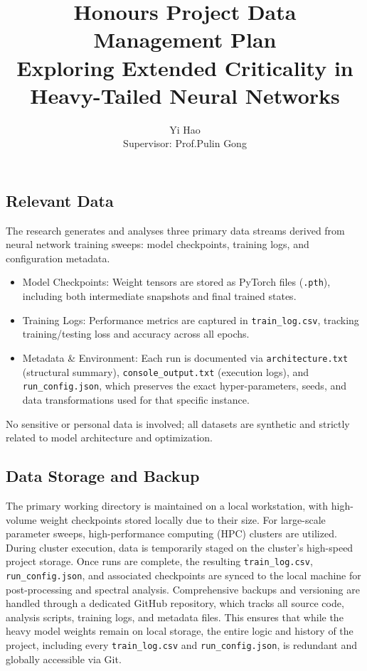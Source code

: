 \documentclass[11pt,a4paper]{article}
\author{Yi Hao \vspace{0.35cm} \\ Supervisor: Prof.\;Pulin Gong}
\title{\textbf{Honours Project Data Management Plan} \\[1.5ex] Exploring Extended Criticality in Heavy-Tailed Neural Networks}
\begin{document}
\maketitle
\subsection*{Relevant Data}
The research generates and analyses three primary data streams derived from neural network training sweeps: model checkpoints, training logs, and configuration metadata.
\begin{itemize}
\item Model Checkpoints: Weight tensors are stored as PyTorch files (\texttt{.pth}), including both intermediate snapshots and final trained states.
\item Training Logs: Performance metrics are captured in \texttt{train\_log.csv}, tracking training/testing loss and accuracy across all epochs.
\item Metadata \& Environment: Each run is documented via \texttt{architecture.txt} (structural summary), \texttt{console\_output.txt} (execution logs), and \texttt{run\_config.json}, which preserves the exact hyper-parameters, seeds, and data transformations used for that specific instance.
\end{itemize}
No sensitive or personal data is involved; all datasets are synthetic and strictly related to model architecture and optimization.
\subsection*{Data Storage and Backup}
The primary working directory is maintained on a local workstation, with high-volume weight checkpoints stored locally due to their size. For large-scale parameter sweeps, high-performance computing (HPC) clusters are utilized. During cluster execution, data is temporarily staged on the cluster's high-speed project storage. Once runs are complete, the resulting \texttt{train\_log.csv}, \texttt{run\_config.json}, and associated checkpoints are synced to the local machine for post-processing and spectral analysis.\vspace{0.4cm}
Comprehensive backups and versioning are handled through a dedicated GitHub repository, which tracks all source code, analysis scripts, training logs, and metadata files. This ensures that while the heavy model weights remain on local storage, the entire logic and history of the project, including every \texttt{train\_log.csv} and \texttt{run\_config.json}, is redundant and globally accessible via Git.
\end{document}
